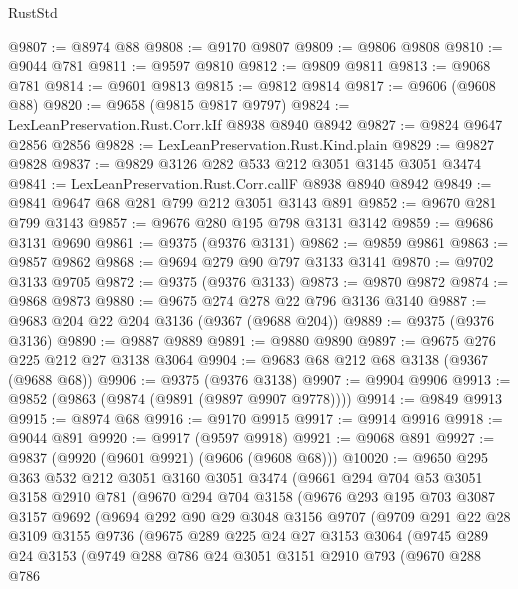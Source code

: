 \begin{lexlean}{RustStd}
\begin{coremodule}
@9807 := @8974 @88
@9808 := @9170 @9807
@9809 := @9806 @9808
@9810 := @9044 @781
@9811 := @9597 @9810
@9812 := @9809 @9811
@9813 := @9068 @781
@9814 := @9601 @9813
@9815 := @9812 @9814
@9817 := @9606 (@9608 @88)
@9820 := @9658 (@9815 @9817 @9797)
@9824 := LexLeanPreservation.Rust.Corr.kIf @8938 @8940 @8942
@9827 := @9824 @9647 @2856 @2856
@9828 := LexLeanPreservation.Rust.Kind.plain
@9829 := @9827 @9828
@9837 := @9829 @3126 @282 @533 @212 @3051 @3145 @3051 @3474
@9841 := LexLeanPreservation.Rust.Corr.callF @8938 @8940 @8942
@9849 := @9841 @9647 @68 @281 @799 @212 @3051 @3143 @891
@9852 := @9670 @281 @799 @3143
@9857 := @9676 @280 @195 @798 @3131 @3142
@9859 := @9686 @3131 @9690
@9861 := @9375 (@9376 @3131)
@9862 := @9859 @9861
@9863 := @9857 @9862
@9868 := @9694 @279 @90 @797 @3133 @3141
@9870 := @9702 @3133 @9705
@9872 := @9375 (@9376 @3133)
@9873 := @9870 @9872
@9874 := @9868 @9873
@9880 := @9675 @274 @278 @22 @796 @3136 @3140
@9887 := @9683 @204 @22 @204 @3136 (@9367 (@9688 @204))
@9889 := @9375 (@9376 @3136)
@9890 := @9887 @9889
@9891 := @9880 @9890
@9897 := @9675 @276 @225 @212 @27 @3138 @3064
@9904 := @9683 @68 @212 @68 @3138 (@9367 (@9688 @68))
@9906 := @9375 (@9376 @3138)
@9907 := @9904 @9906
@9913 := @9852 (@9863 (@9874 (@9891 (@9897 @9907 @9778))))
@9914 := @9849 @9913
@9915 := @8974 @68
@9916 := @9170 @9915
@9917 := @9914 @9916
@9918 := @9044 @891
@9920 := @9917 (@9597 @9918)
@9921 := @9068 @891
@9927 := @9837 (@9920 (@9601 @9921) (@9606 (@9608 @68)))
@10020 := @9650
    @295
    @363
    @532
    @212
    @3051
    @3160
    @3051
    @3474
    (@9661
      @294
      @704
      @53
      @3051
      @3158
      @2910
      @781
      (@9670
        @294
        @704
        @3158
        (@9676
          @293
          @195
          @703
          @3087
          @3157
          @9692
          (@9694
            @292
            @90
            @29
            @3048
            @3156
            @9707
            (@9709
              @291
              @22
              @28
              @3109
              @3155
              @9736
              (@9675
                @289
                @225
                @24
                @27
                @3153
                @3064
                (@9745
                  @289
                  @24
                  @3153
                  (@9749
                    @288
                    @786
                    @24
                    @3051
                    @3151
                    @2910
                    @793
                    (@9670
                      @288
                      @786

\end{coremodule}
\end{lexlean}
